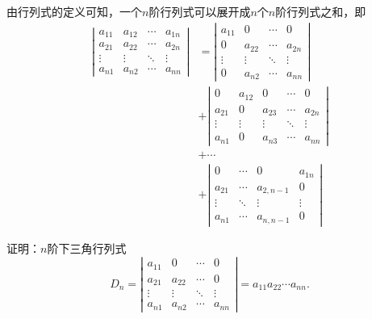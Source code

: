 \begin{frame}
由行列式的定义可知，一个$n$阶行列式可以展开成$n$个$n$阶行列式之和，即
$$
\begin{aligned}
  \left|
    \begin{array}{cccc}
      a_{11}  &  a_{12} & \cdots & a_{1n} \\
      a_{21}  &  a_{22} & \cdots & a_{2n} \\
      \vdots & \vdots & \ddots & \vdots\\  
      a_{n1}  &  a_{n2} & \cdots & a_{nn} 
    \end{array}
  \right| &= 
  \left|
    \begin{array}{cccc}
      a_{11}  &  0 & \cdots & 0 \\
      0  &  a_{22} & \cdots & a_{2n} \\
      \vdots & \vdots & \ddots & \vdots\\  
      0  &  a_{n2} & \cdots & a_{nn} 
    \end{array}
  \right|  \\[0.1in]
  &+ \left|
    \begin{array}{ccccc}
      0  &  a_{12} & 0 & \cdots & 0 \\
      a_{21} & 0  &  a_{23} & \cdots & a_{2n} \\
      \vdots & \vdots & \vdots & \ddots & \vdots\\  
      a_{n1}  & 0&  a_{n3} & \cdots & a_{nn} 
    \end{array}
  \right| \\[0.1in]
  &+ \cdots  \\[0.1in]
  &+ 
  \left|
    \begin{array}{cccc}
      0 & \cdots & 0 & a_{1n} \\
      a_{21}  &   \cdots & a_{2,n-1} & 0 \\
      \vdots &  \ddots & \vdots & \vdots\\  
      a_{n1}  &   \cdots & a_{n,n-1} & 0
    \end{array}
  \right| 
\end{aligned}
$$
%
\end{frame}

\begin{frame}
\begin{li}
  证明：$n$阶下三角行列式
  $$
  D_n = \left|
    \begin{array}{cccc}
      a_{11}  &  0 & \cdots & 0 \\
      a_{21}  &  a_{22} & \cdots & 0 \\
      \vdots & \vdots & \ddots & \vdots\\  
      a_{n1}  &  a_{n2} & \cdots & a_{nn} 
    \end{array}
  \right| = a_{11} a_{22} \cdots a_{nn}.
  $$  
\end{li}
\end{frame}

